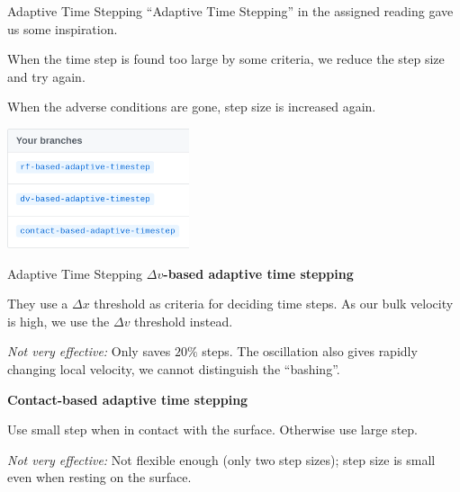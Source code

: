 \documentclass{beamer}
\begin{document}
	\begin{frame}{Adaptive Time Stepping}
		``Adaptive Time Stepping'' in the assigned reading gave us some inspiration.
		
		When the time step is found too large by some criteria, we reduce the step size and try again. 
		
		When the adverse conditions are gone, step size is increased again.
		
		\begin{center}
			\includegraphics[width=0.4\textwidth]{res/branches.png}
		\end{center}
	\end{frame}
	\begin{frame}{Adaptive Time Stepping}
		\textbf{$\Delta v$-based adaptive time stepping}
		
		They use a $\Delta x$ threshold as criteria for deciding time steps. As our bulk velocity is high, we use the $\Delta v$ threshold instead.
		
		\textit{Not very effective:} Only saves $20\%$ steps. The oscillation also gives rapidly changing local velocity, we cannot distinguish the ``bashing''. 
		
		\textbf{Contact-based adaptive time stepping}
		
		Use small step when in contact with the surface. Otherwise use large step.
		
		\textit{Not very effective:} Not flexible enough (only two step sizes); step size is small even when resting on the surface.
	\end{frame}
\end{document}
